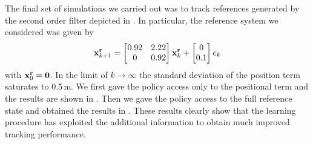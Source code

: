 The final set of simulations we carried out was to track references generated by the second order filter depicted in . In particular, the reference system we considered was given by
\begin{equation*}
\mathbf{x}^{\mathbf{r}}_{k+1} = \begin{bmatrix} 0.92 & 2.22 \\ 0 & 0.92 \end{bmatrix}\mathbf{x}^{\mathbf{r}}_{k} + \begin{bmatrix} 0 \\ 0.1 \end{bmatrix}e_k
\end{equation*}
with $\mathbf{x}^{\mathbf{r}}_0 = \mathbf{0}$. In the limit of $k\rightarrow \infty$ the standard deviation of the position term saturates to 0.5$\,$m. We first gave the policy access only to the positional term and the results are shown in . Then we gave the policy access to the full reference state and obtained the results in . These results clearly show that the learning procedure has exploited the additional information to obtain much improved tracking performance.






